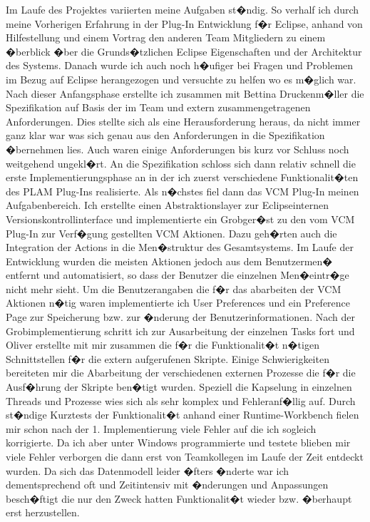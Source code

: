 Im Laufe des Projektes variierten meine Aufgaben st�ndig. So verhalf ich durch meine Vorherigen Erfahrung in der Plug-In Entwicklung f�r Eclipse, anhand von Hilfestellung und einem Vortrag den anderen Team Mitgliedern zu einem �berblick �ber die Grunds�tzlichen Eclipse Eigenschaften und der Architektur des Systems. Danach wurde ich auch noch h�ufiger bei Fragen und Problemen im Bezug auf Eclipse herangezogen und versuchte zu helfen wo es m�glich war. 
Nach dieser Anfangsphase erstellte ich zusammen mit Bettina Druckenm�ller die Spezifikation auf Basis der im Team und extern zusammengetragenen Anforderungen. Dies stellte sich als eine Herausforderung heraus, da nicht immer ganz klar war was sich genau aus den Anforderungen in die Spezifikation �bernehmen lies. Auch waren einige Anforderungen bis kurz vor Schluss noch weitgehend ungekl�rt. 
An die Spezifikation schloss sich dann relativ schnell die erste Implementierungsphase an in der ich zuerst verschiedene Funktionalit�ten des PLAM Plug-Ins realisierte. Als n�chstes fiel dann das VCM Plug-In meinen Aufgabenbereich. Ich erstellte einen Abstraktionslayer zur Eclipseinternen Versionskontrollinterface und implementierte ein Grobger�st zu den vom VCM Plug-In zur Verf�gung gestellten VCM Aktionen. Dazu geh�rten auch die Integration der Actions in die Men�struktur des Gesamtsystems. Im Laufe der Entwicklung wurden die meisten Aktionen jedoch aus dem Benutzermen� entfernt und automatisiert, so dass der Benutzer die einzelnen Men�eintr�ge nicht mehr sieht.
Um die Benutzerangaben die f�r das abarbeiten der VCM Aktionen n�tig waren implementierte ich User Preferences und ein Preference Page zur Speicherung bzw. zur �nderung der Benutzerinformationen. 
Nach der Grobimplementierung schritt ich zur Ausarbeitung der
einzelnen Tasks fort und Oliver erstellte mit mir zusammen die f�r
die Funktionalit�t n�tigen Schnittstellen f�r die extern
aufgerufenen Skripte.
Einige Schwierigkeiten bereiteten mir die Abarbeitung der verschiedenen externen Prozesse die f�r die Ausf�hrung der Skripte ben�tigt wurden. Speziell die Kapselung in einzelnen Threads  und Prozesse wies sich als sehr komplex und Fehleranf�llig auf. Durch st�ndige Kurztests der Funktionalit�t anhand einer Runtime-Workbench fielen mir schon nach der 1. Implementierung viele Fehler auf die ich sogleich korrigierte. Da ich aber unter Windows programmierte und testete blieben mir viele Fehler verborgen die dann erst von Teamkollegen im Laufe der Zeit entdeckt wurden. Da sich das Datenmodell leider �fters �nderte war ich dementsprechend oft und Zeitintensiv mit �nderungen und Anpassungen besch�ftigt die nur den Zweck hatten Funktionalit�t wieder bzw. �berhaupt erst herzustellen.

